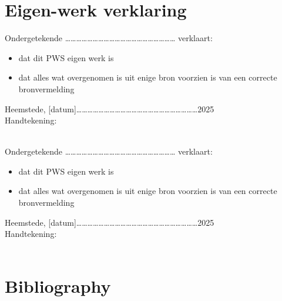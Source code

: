 \documentclass[a4paper,12pt,titlepage]{article}
\begin{document}
\pagebreak
\section{Eigen-werk verklaring}
Ondergetekende …………………………………………………… verklaart:

\begin{itemize}
	\item{dat dit PWS eigen werk is}
	\item{dat alles wat overgenomen is uit enige bron voorzien is van een correcte bronvermelding}
\end{itemize}

Heemstede, [datum]…………………………………………………………2025 \\

Handtekening: \\ \\
\vspace{3cm}

Ondergetekende …………………………………………………… verklaart:

\begin{itemize}
	\item{dat dit PWS eigen werk is}
	\item{dat alles wat overgenomen is uit enige bron voorzien is van een correcte bronvermelding}
\end{itemize}

Heemstede, [datum]…………………………………………………………2025 \\

Handtekening: \\ \\

\pagebreak
\section{Bibliography}
\nocite{*}
\printbibliography
\end{document}
